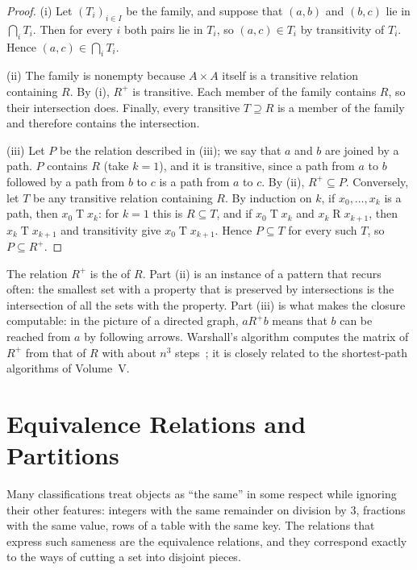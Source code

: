 \begin{proof}
(i) Let $(T_i)_{i\in I}$ be the family, and suppose that $(a,b)$ and $(b,c)$ lie in $\bigcap_iT_i$. Then for every $i$ both pairs lie in $T_i$, so $(a,c)\in T_i$ by transitivity of $T_i$. Hence $(a,c)\in\bigcap_iT_i$.

(ii) The family is nonempty because $A\times A$ itself is a transitive relation containing $R$. By (i), $R^+$ is transitive. Each member of the family contains $R$, so their intersection does. Finally, every transitive $T\supseteq R$ is a member of the family and therefore contains the intersection.

(iii) Let $P$ be the relation described in (iii); we say that $a$ and $b$ are joined by a path. $P$ contains $R$ (take $k=1$), and it is transitive, since a path from $a$ to $b$ followed by a path from $b$ to $c$ is a path from $a$ to $c$. By (ii), $R^+\subseteq P$. Conversely, let $T$ be any transitive relation containing $R$. By induction on $k$, if $x_0,\ldots,x_k$ is a path, then $x_0\mathrel{T}x_k$: for $k=1$ this is $R\subseteq T$, and if $x_0\mathrel{T}x_k$ and $x_k\mathrel{R}x_{k+1}$, then $x_k\mathrel{T}x_{k+1}$ and transitivity give $x_0\mathrel{T}x_{k+1}$. Hence $P\subseteq T$ for every such $T$, so $P\subseteq R^+$.
\end{proof}

The relation $R^+$ is the  of $R$. Part (ii) is an instance of a pattern that recurs often: the smallest set with a property that is preserved by intersections is the intersection of all the sets with the property. Part (iii) is what makes the closure computable: in the picture of a directed graph, $a\mathrel{R^+}b$ means that $b$ can be reached from $a$ by following arrows. Warshall's algorithm computes the matrix of $R^+$ from that of $R$ with about $n^3$ steps~\cite{warshall1962}; it is closely related to the shortest-path algorithms of Volume~V.

\section{Equivalence Relations and Partitions}
\label{sec:equivalence}

Many classifications treat objects as ``the same'' in some respect while ignoring their other features: integers with the same remainder on division by $3$, fractions with the same value, rows of a table with the same key. The relations that express such sameness are the equivalence relations, and they correspond exactly to the ways of cutting a set into disjoint pieces.


